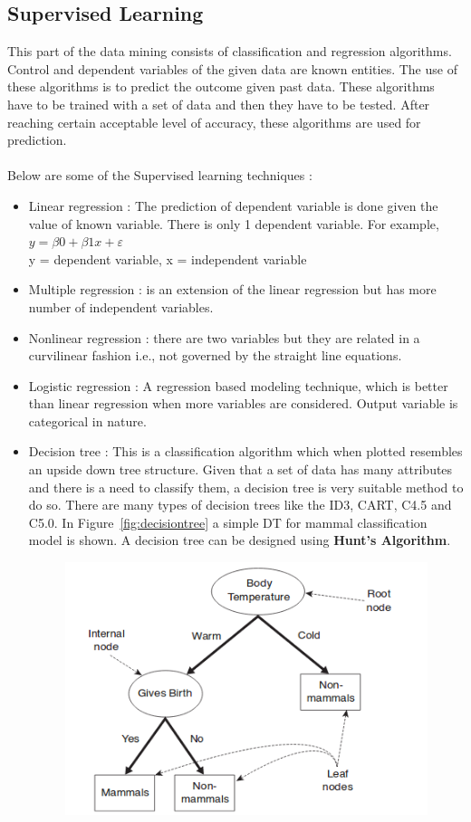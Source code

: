 \subsection{Supervised Learning}
This part of the data mining consists of classification and regression algorithms. Control and dependent variables of the given data are known entities. The use of these algorithms is to predict the outcome given past data. These algorithms have to be trained with a set of data and then they have to be tested. After reaching certain acceptable level of accuracy, these algorithms are used for prediction. 
\\
\\
Below are some of the Supervised learning techniques :
\begin{itemize}
	\item Linear regression : The prediction of dependent variable is done given the value of known variable. There is only 1 dependent variable. For example, \(y=\beta0 + \beta1x + \varepsilon\) \\
	y = dependent variable, 
	x = independent variable
	\item Multiple regression : is an extension of the linear regression but has more number of independent variables.
	\item Nonlinear regression : there are two variables but they are related in a curvilinear fashion i.e., not governed by the straight line equations.
	\item Logistic regression : A regression based modeling technique, which is better than linear regression when more variables are considered. Output variable is categorical in nature. 
	\item Decision tree : This is a classification algorithm which when plotted resembles an upside down tree structure. Given that a set of data has many attributes and there is a need to classify them, a decision tree is very suitable method to do so. There are many types of decision trees like the ID3, CART, C4.5 and C5.0. In Figure~\ref{fig:decisiontree} a simple DT for mammal classification model is shown. A decision tree can be designed using \textbf{Hunt's Algorithm}.
	\begin{figure}[H]
		\includegraphics[scale=0.65]{figures/example_decisiontree.png}

\end{figure}
\end{itemize}
